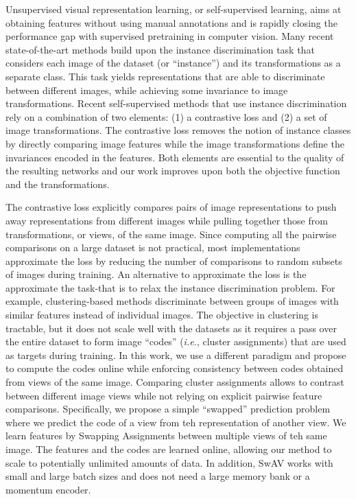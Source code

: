 \documentclass[conference]{IEEEtran}
\begin{document}
Unsupervised visual representation learning, or self-supervised learning, aims at obtaining features without using manual annotations and is rapidly closing the performance gap with supervised pretraining in computer vision.
Many recent state-of-the-art methods build upon the instance discrimination task that considers each image of the dataset (or ``instance'') and its transformations as a separate class.
This task yields representations that are able to discriminate between different images, while achieving some invariance to image transformations.
Recent self-supervised methods that use instance discrimination rely on a combination of two elements: (1) a contrastive loss and (2) a set of image transformations.
The contrastive loss removes the notion of instance classes by directly comparing image features while the image transformations define the invariances encoded in the features.
Both elements are essential to the quality of the resulting networks and our work improves upon both the objective function and the transformations.

The contrastive loss explicitly compares pairs of image representations to push away representations from different images while pulling together those from transformations, or views, of the same image.
Since computing all the pairwise comparisons on a large dataset is not practical, most implementations approximate the loss by reducing the number of comparisons to random subsets of images during training.
An alternative to approximate the loss is the approximate the task-that is to relax the instance discrimination problem. 
For example, clustering-based methods discriminate between groups of images with similar features instead of individual images. 
The objective in clustering is tractable, but it does not scale well with the datasets as it requires a pass over the entire dataset to form image ``codes'' (\textit{i.e.}, cluster assignments) that are used as targets during training.
In this work, we use a different paradigm and propose to compute the codes online while enforcing consistency between codes obtained from views of the same image.
Comparing cluster assignments allows to contrast between different image views while not relying on explicit pairwise feature comparisons.
Specifically, we propose a simple ``swapped'' prediction problem where we predict the code of a view from teh representation of another view. 
We learn features by Swapping Assignments between multiple views of teh same image. The features and the codes are learned online, allowing our method to scale to potentially unlimited amounts of data.
In addition, SwAV works with small and large batch sizes and does not need a large memory bank or a momentum encoder.
\end{document}
